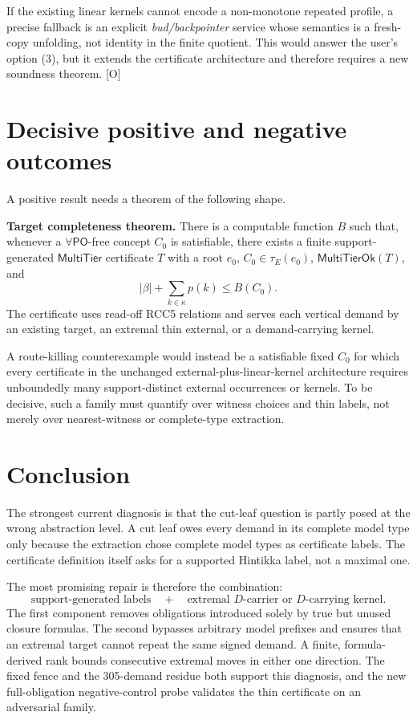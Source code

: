 \documentclass[11pt,letterpaper]{article}
\newcommand{\PO}{\ensuremath{\mathsf{PO}}}
\newcommand{\MultiTier}{\ensuremath{\mathsf{MultiTier}}}
\newcommand{\MultiTierOk}{\ensuremath{\mathsf{MultiTierOk}}}
\theoremstyle{definition}
\theoremstyle{plain}
\theoremstyle{remark}
\begin{document}
If the existing linear kernels cannot encode a non-monotone repeated profile,
a precise fallback is an explicit \emph{bud/backpointer} service whose semantics
is a fresh-copy unfolding, not identity in the finite quotient.  This would
answer the user's option (3), but it extends the certificate architecture and
therefore requires a new soundness theorem. [O]

\section{Decisive positive and negative outcomes}

A positive result needs a theorem of the following shape.

\begin{researchbox}
\textbf{Target completeness theorem.}
There is a computable function $B$ such that, whenever a $\forall\PO$-free
concept $C_0$ is satisfiable, there exists a finite support-generated
\MultiTier{} certificate $T$ with a root $e_0$, $C_0\in\tau_E(e_0)$,
\MultiTierOk$(T)$, and
\[
  |\beta|+\sum_{k\in\kappa}p(k)\leq B(C_0).
\]
The certificate uses read-off RCC5 relations and serves each vertical demand by
an existing target, an extremal thin external, or a demand-carrying kernel.
\end{researchbox}

A route-killing counterexample would instead be a satisfiable fixed $C_0$ for
which every certificate in the unchanged external-plus-linear-kernel
architecture requires unboundedly many support-distinct external occurrences
or kernels.  To be decisive, such a family must quantify over witness choices
and thin labels, not merely over nearest-witness or complete-type extraction.

\section{Conclusion}

The strongest current diagnosis is that the cut-leaf question is partly posed
at the wrong abstraction level.  A cut leaf owes every demand in its complete
model type only because the extraction chose complete model types as certificate
labels.  The certificate definition itself asks for a supported Hintikka label,
not a maximal one.

The most promising repair is therefore the combination:
\[
  \boxed{\text{support-generated labels}}
  \quad+\quad
  \boxed{\text{extremal $D$-carrier or $D$-carrying kernel}}.
\]
The first component removes obligations introduced solely by true but unused
closure formulas.  The second bypasses arbitrary model prefixes and ensures
that an extremal target cannot repeat the same signed demand.  A finite,
formula-derived rank bounds consecutive extremal moves in either one direction.
The fixed fence and the 305-demand residue both support this diagnosis, and the
new full-obligation negative-control probe validates the thin certificate on an
adversarial family.
\end{document}
